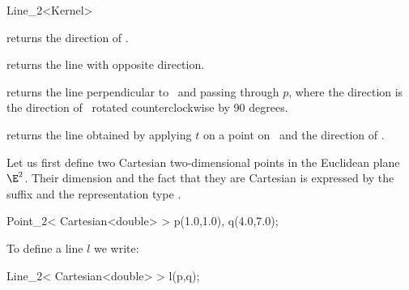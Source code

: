 \begin{ccRefClass} {Line_2<Kernel>}
       {}
\ccGlue
{}
       {}
\ccGlue
{}
       {}


       {returns the direction of \ccVar.}

       {returns the line with opposite direction.}

        {returns the line perpendicular to \ccVar\ and passing through $p$,
         where the direction is the direction of \ccVar\ rotated 
         counterclockwise by 90 degrees.}

       {returns the line obtained by applying $t$ on a point on \ccVar\ 
        and the direction of \ccVar.}



\ccExample
Let us first define two Cartesian two-dimensional points in the Euclidean 
plane $\E^2$. Their
dimension and the fact that they are Cartesian is expressed by
the suffix  and the representation type .

\begin{cprog}

  Point_2< Cartesian<double> >  p(1.0,1.0), q(4.0,7.0);
\end{cprog} 

To define a line $l$ we write:

\begin{cprog}

  Line_2< Cartesian<double> > l(p,q);
\end{cprog} 

\ccSeeAlso
{} \\

\end{ccRefClass} 
